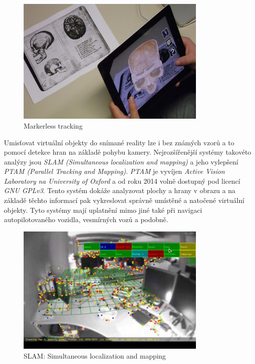 \documentclass[twoside,12pt]{article}
\begin{document}
\begin{figure}[H]
    \includegraphics[width=350px, center]{images/markerless-tracking.jpg}
    \caption{Markerless tracking}
    \label{markerless_tracking}
\end{figure}

Umisťovat virtuální objekty do snímané reality lze i bez známých vzorů a to pomocí detekce hran na základě pohybu kamery. Nejrozšířenější systémy takovéto analýzy jsou \textit{SLAM (Simultaneous localization and mapping)} a jeho vylepšení \textit{PTAM (Parallel Tracking and Mapping)}. \textit{PTAM} je vyvíjen \textit{Active Vision Laboratory na University of Oxford} a od roku 2014 volně dostupný pod licencí \textit{GNU GPLv3}. Tento systém dokáže analyzovat plochy a hrany v obrazu a na základě těchto informací pak vykreslovat správně umístěné a natočené virtuální objekty. Tyto systémy mají uplatnění mimo jiné také při navigaci autopilotovaného vozidla, vesmírných vozů a podobně.

\begin{figure}[H]
    \includegraphics[width=350px, center]{images/slam.jpg}
    \caption{SLAM: Simultaneous localization and mapping}
    \label{slam}
\end{figure}


%
%
\end{document}
